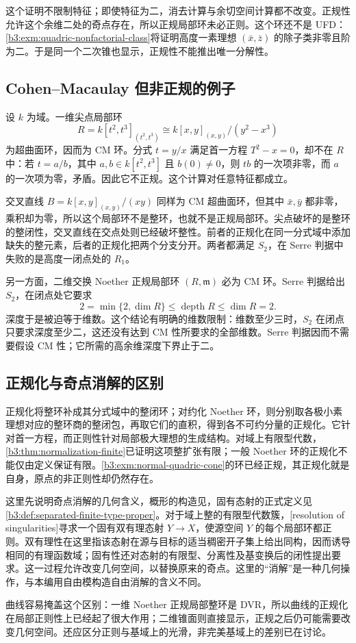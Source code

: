这个证明不限制特征；即使特征为二，消去计算与余切空间计算都不改变。正规性允许这个余维二处的奇点存在，所以正规局部环未必正则。这个环还不是 UFD：\cref{b3:exm:quadric-nonfactorial-class}将证明高度一素理想 \((\bar x,\bar z)\) 的除子类非零且阶为二。于是同一个二次锥也显示，正规性不能推出唯一分解性。

\subsection{Cohen–Macaulay 但非正规的例子}
\label{b3:subsec:2004:02}

设 \(k\) 为域。一维尖点局部环
\[
	R=k[t^2,t^3]_{(t^2,t^3)}\cong k[x,y]_{(x,y)}/(y^2-x^3)
\]
为超曲面环，因而为 CM 环。分式 \(t=y/x\) 满足首一方程 \(T^2-x=0\)，却不在 \(R\) 中：若 \(t=a/b\)，其中 \(a,b\in k[t^2,t^3]\) 且 \(b(0)\ne0\)，则 \(tb\) 的一次项非零，而 \(a\) 的一次项为零，矛盾。因此它不正规。这个计算对任意特征都成立。

\ProseParagraphBreak
交叉直线 \(B=k[x,y]_{(x,y)}/(xy)\) 同样为 CM 超曲面环，但其中 \(\bar x,\bar y\) 都非零，乘积却为零，所以这个局部环不是整环，也就不是正规局部环。尖点破坏的是整环的整闭性，交叉直线在交点处则已经破坏整性。前者的正规化在同一分式域中添加缺失的整元素，后者的正规化把两个分支分开。两者都满足 \(S_2\)，在 Serre 判据中失败的是高度一闭点处的 \(R_1\)。

\ProseParagraphBreak
另一方面，二维交换 Noether 正规局部环 \((R,\mathfrak m)\) 必为 CM 环。Serre 判据给出 \(S_2\)，在闭点处它要求
\[
	2=\min\{2,\dim R\}\le\operatorname{depth}R \le\dim R=2.
\]
深度于是被迫等于维数。这个结论有明确的维数限制：维数至少三时，\(S_2\) 在闭点只要求深度至少二，这还没有达到 CM 性所要求的全部维数。Serre 判据因而不需要假设 CM 性；它所需的高余维深度下界止于二。

\subsection{正规化与奇点消解的区别}
\label{b3:subsec:2004:03}

正规化将整环补成其分式域中的整闭环；对约化 Noether 环，则分别取各极小素理想对应的整环商的整闭包，再取它们的直积，得到各不可约分量的正规化。它针对首一方程，而正则性针对局部极大理想的生成结构。对域上有限型代数，\cref{b3:thm:normalization-finite}已证明这项整扩张有限；一般 Noether 环的正规化不能仅由定义保证有限。\cref{b3:exm:normal-quadric-cone}的环已经正规，其正规化就是自身，原点的非正则性却仍然存在。

\ProseParagraphBreak
这里先说明奇点消解的几何含义，概形的构造见，固有态射的正式定义见\cref{b3:def:separated-finite-type-proper}。对于域上整的有限型代数簇，[resolution of singularities]寻求一个固有双有理态射 \(Y\to X\)，使源空间 \(Y\) 的每个局部环都正则。双有理性在这里指该态射在源与目标的适当稠密开子集上给出同构，因而诱导相同的有理函数域；固有性还对态射的有限型、分离性及基变换后的闭性提出要求。这一过程允许改变几何空间，以替换原来的奇点。这里的“消解”是一种几何操作，与本编用自由模构造自由消解的含义不同。

\ProseParagraphBreak
曲线容易掩盖这个区别：一维 Noether 正规局部整环是 DVR，所以曲线的正规化在局部正则性上已经起了很大作用；二维锥面则直接显示，正规之后仍可能需要改变几何空间。还应区分正则与基域上的光滑，非完美基域上的差别已在讨论。
